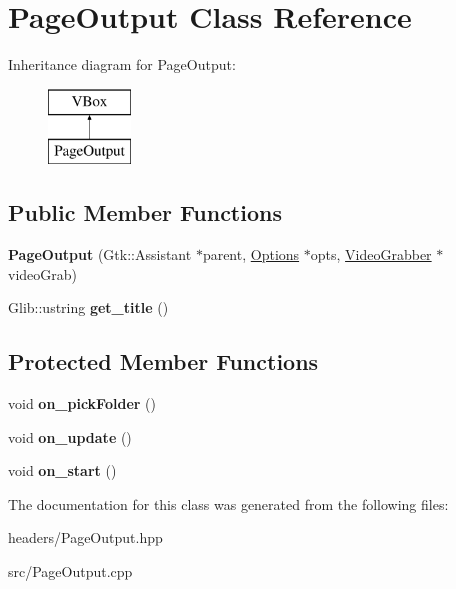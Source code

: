 \hypertarget{classPageOutput}{\section{Page\-Output Class Reference}
\label{classPageOutput}
}
Inheritance diagram for Page\-Output\-:\begin{figure}[H]
\begin{center}
\leavevmode
\includegraphics[height=2.000000cm]{classPageOutput}
\end{center}
\end{figure}
\subsection*{Public Member Functions}
\begin{DoxyCompactItemize}
\item 
\hypertarget{classPageOutput_acbea1db510bfecfba8afdd91e1b802cc}{{\bfseries Page\-Output} (Gtk\-::\-Assistant $\ast$parent, \hyperlink{structOptions}{Options} $\ast$opts, \hyperlink{classVideoGrabber}{Video\-Grabber} $\ast$video\-Grab)}\label{classPageOutput_acbea1db510bfecfba8afdd91e1b802cc}

\item 
\hypertarget{classPageOutput_a3d1a65461ace501e4a3767ff3794b283}{Glib\-::ustring {\bfseries get\-\_\-title} ()}\label{classPageOutput_a3d1a65461ace501e4a3767ff3794b283}

\end{DoxyCompactItemize}
\subsection*{Protected Member Functions}
\begin{DoxyCompactItemize}
\item 
\hypertarget{classPageOutput_a91541fd8cb13443f97989f1989ffc3b8}{void {\bfseries on\-\_\-pick\-Folder} ()}\label{classPageOutput_a91541fd8cb13443f97989f1989ffc3b8}

\item 
\hypertarget{classPageOutput_ad37e7bfcc6ed09a50c601eb89219897a}{void {\bfseries on\-\_\-update} ()}\label{classPageOutput_ad37e7bfcc6ed09a50c601eb89219897a}

\item 
\hypertarget{classPageOutput_a10a3304731ccf58f892a5c336a119d1a}{void {\bfseries on\-\_\-start} ()}\label{classPageOutput_a10a3304731ccf58f892a5c336a119d1a}

\end{DoxyCompactItemize}


The documentation for this class was generated from the following files\-:\begin{DoxyCompactItemize}
\item 
headers/Page\-Output.\-hpp\item 
src/Page\-Output.\-cpp\end{DoxyCompactItemize}
